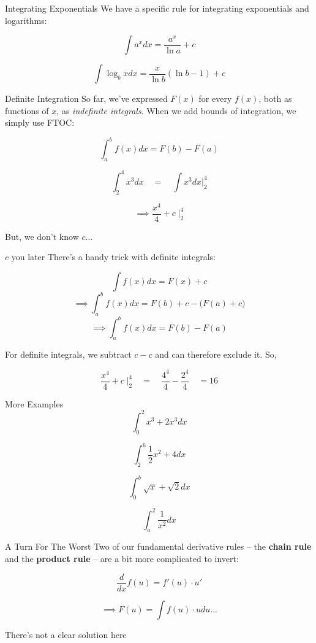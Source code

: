 \documentclass[10pt]{beamer}
\begin{document}
\begin{frame}{Integrating Exponentials}
    We have a specific rule for integrating exponentials and logarithms:

    \[\int a^x dx  = \frac{a^x}{\ln a} + c\]

    \[\int \log_b x dx = \frac{x}{\ln b} (\ln b - 1) + c\]
\end{frame}

\begin{frame}{Definite Integration}
    So far, we've expressed $F(x)$ for every $f(x)$, both as functions of $x$, as \textit{indefinite integrals}. When we add bounds of integration, we simply use FTOC:

    \[\int_a^b f(x)dx = F(b) - F(a)\]

    \[\int_2^4 x^3 dx \quad = \quad \int x^3 dx \bigg|_2^4 \]

    \[\implies \frac{x^4}{4} + c \;\bigg|_2^4\]

    But, we don't know $c$...
\end{frame}

\begin{frame}{$c$ you later}
    There's a handy trick with definite integrals:

    \[\int f(x) dx = F(x) + c\]
    \[\implies \int_a^b f(x) dx = F(b) + c - \Big( F(a) + c\Big)\]
    \[\implies \int_a^b f(x) dx = F(b) - F(a)\]

    For definite integrals, we subtract $c-c$ and can therefore exclude it. So,

    \[\frac{x^4}{4} + c \; \bigg|_2^4 \quad = \quad \frac{4^4}{4} - \frac{2^4}{4} \quad = 16\]
\end{frame}

\begin{frame}{More Examples}
    \[\int_0^2 x^3 + 2x^3 dx\] \pause

    \[\int_2^6 \frac{1}{2} x^2 + 4 dx\] \pause 

    \[\int_0^b \sqrt{x} + \sqrt{2} dx\] \pause

    \[\int_{a}^{2} \frac{1}{x^2} dx\] \pause
\end{frame}

\begin{frame}{A Turn For The Worst}
    Two of our fundamental derivative rules -- the \textbf{chain rule} and the \textbf{product rule} -- are a bit more complicated to invert:

    \[\frac{d}{dx}f(u) = f'(u) \cdot u'\]

    \[\implies F(u) = \int f(u) \cdot u du...\]

    There's not a clear solution here
\end{frame}
\end{document}
